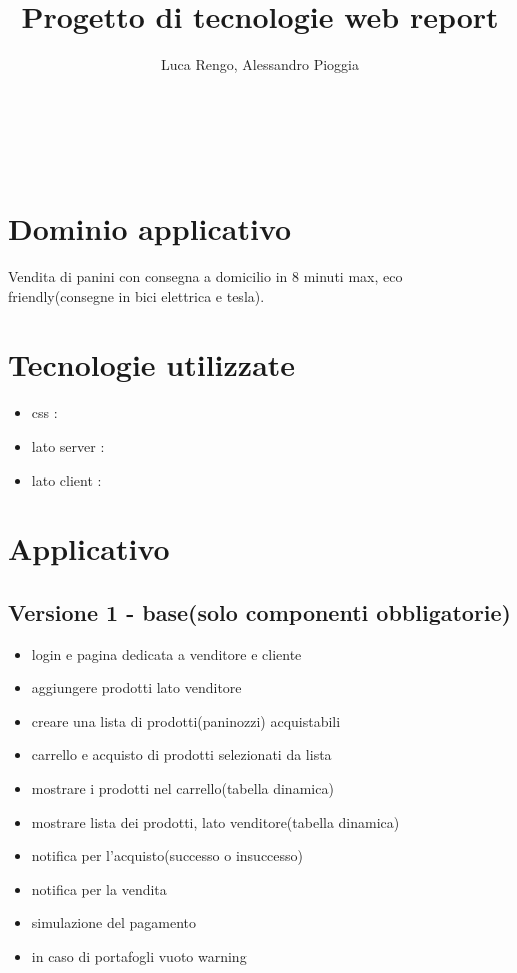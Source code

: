 \documentclass[a4paper,12pt]{report}
\title{\textbf{Progetto di tecnologie web report}}
\author{Luca Rengo, Alessandro Pioggia}
\begin{document}
	
	\makeatletter
	\begin{titlepage}
		\begin{center}
			{\Huge  \@title }\\[3ex] 
			{\large  \@author}\\[3ex] 
			{\large \@date}
		\end{center}
	\end{titlepage}
	\makeatother
	\thispagestyle{empty}
	\newpage
	
	
	\tableofcontents

	\newpage
	
	
	\section{Dominio applicativo}
	Vendita di panini con consegna a domicilio in 8 minuti max, eco friendly(consegne in bici elettrica e tesla).
	\section{Tecnologie utilizzate}
	\begin{itemize}
		\item css : 
		\item lato server : 
		\item lato client : 
	\end{itemize}
	\section{Applicativo}
	\subsection{Versione 1 - base(solo componenti obbligatorie)}
	\begin{itemize}
		\item login e pagina dedicata a venditore e cliente
		\item aggiungere prodotti lato venditore
		\item creare una lista di prodotti(paninozzi) acquistabili
		\item carrello e acquisto di prodotti selezionati da lista
		\item mostrare i prodotti nel carrello(tabella dinamica)
		\item mostrare lista dei prodotti, lato venditore(tabella dinamica)
		\item notifica per l'acquisto(successo o insuccesso)
		\item notifica per la vendita
		\item simulazione del pagamento
		\item in caso di portafogli vuoto warning
	\end{itemize}
\end{document}
